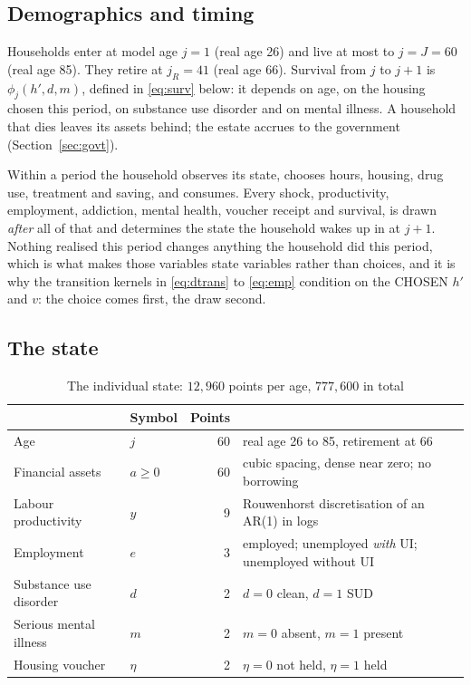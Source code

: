 \documentclass[11pt]{article}
\begin{document}
\subsection{Demographics and timing}

Households enter at model age $j=1$ (real age 26) and live at most to $j=J=60$
(real age 85). They retire at $j_{R}=41$ (real age 66). Survival from $j$ to
$j+1$ is $\phi_j(h',d,m)$, defined in \eqref{eq:surv} below: it depends on age,
on the housing chosen this period, on substance use disorder and on mental
illness. A household that dies leaves its assets behind; the estate accrues to
the government (Section~\ref{sec:govt}).

Within a period the household observes its state, chooses hours, housing,
drug use, treatment and saving, and consumes. Every shock, productivity,
employment, addiction, mental health, voucher receipt and survival, is drawn
\emph{after} all of that and determines the state the household wakes up in at
$j+1$. Nothing realised this period changes anything the household did this
period, which is what makes those variables state variables rather than choices,
and it is why the transition kernels in \eqref{eq:dtrans} to \eqref{eq:emp}
condition on the CHOSEN $h'$ and $v$: the choice comes first, the draw second.

\subsection{The state}

\begin{table}[h]
\centering
\caption{The individual state: $12{,}960$ points per age, $777{,}600$ in total}
\label{tab:state}
\begin{tabular}{llrL{6.9cm}}
\toprule
& Symbol & Points & \\
\midrule
Age & $j$ & 60 & real age 26 to 85, retirement at 66\\
Financial assets & $a\ge0$ & 60 & cubic spacing, dense near zero; no borrowing\\
Labour productivity & $y$ & 9 & Rouwenhorst discretisation of an AR(1) in logs\\
Employment & $e$ & 3 & employed; unemployed \emph{with} UI; unemployed without UI\\
Substance use disorder & $d$ & 2 & $d=0$ clean, $d=1$ SUD\\
Serious mental illness & $m$ & 2 & $m=0$ absent, $m=1$ present\\
Housing voucher & $\eta$ & 2 & $\eta=0$ not held, $\eta=1$ held\\
\bottomrule
\end{tabular}
\end{table}
\end{document}

